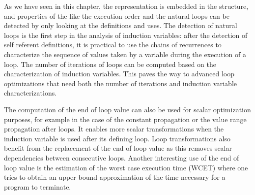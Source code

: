 As we have seen in this chapter, the \CFG{} representation is embedded
in the \SSA{} structure, and properties of the \CFG{} like the
execution order and the natural loops can be detected by only looking
at the \SSA{} definitions and uses.  The detection of natural loops is
the first step in the analysis of induction variables: after the
detection of self referent definitions, it is practical to use the
chains of recurrences \cite{BWZ94,KMZ98,Zim01} to characterize the
sequence of values taken by a variable during the execution of a loop.
The number of iterations of loops can be computed based on the
characterization of induction variables.  This paves the way to
advanced loop optimizations that need both the number of iterations
and induction variable characterizations.

The computation of the end of loop value can also be used for scalar
optimization purposes, for example in the case of the constant
propagation or the value range propagation after loops.  It enables
more scalar transformations when the induction variable is used after
its defining loop.  Loop transformations also benefit from the
replacement of the end of loop value as this removes scalar
dependencies between consecutive loops.  Another interesting use of the
end of loop value is the estimation of the worst case execution time
(WCET) where one tries to obtain an upper bound approximation of the
time necessary for a program to terminate.

